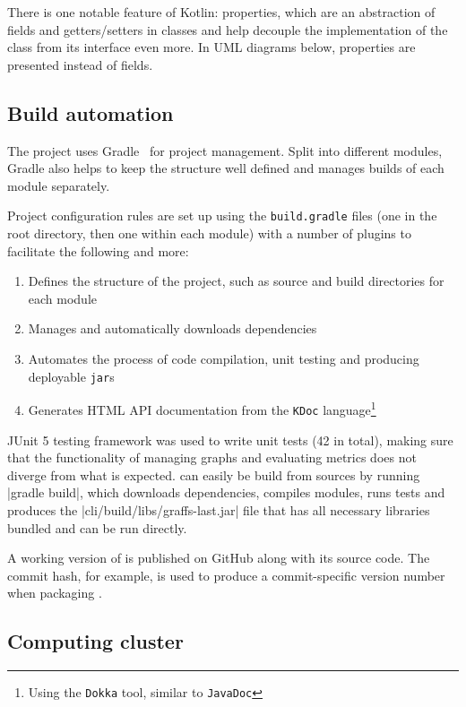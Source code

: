 There is one notable feature of Kotlin: properties, which are an abstraction of fields and getters/setters in classes and help decouple the implementation of the class from its interface even more.
In UML diagrams below, properties are presented instead of fields.

\subsection{Build automation}

The project uses Gradle~\cite{BerglundBuildingTestingGradle2011} for project management.
Split into different modules, Gradle also helps to keep the structure well defined and manages builds of each module separately.

Project configuration rules are set up using the \texttt{build.gradle} files (one in the root directory, then one within each module) with a number of plugins to facilitate the following and more:
\begin{enumerate}[topsep=5pt,itemsep=0pt]
    \item Defines the structure of the project, such as source and build directories for each module
    \item Manages and automatically downloads dependencies
    \item Automates the process of code compilation, unit testing and producing deployable \texttt{jar}s
    \item Generates HTML API documentation from the \texttt{KDoc} language\footnote{Using the \texttt{Dokka} tool, similar to \texttt{JavaDoc}}
\end{enumerate}

JUnit 5 testing framework was used to write unit tests (42 in total), making sure that the functionality of managing graphs and evaluating metrics does not diverge from what is expected.
\graffs can easily be build from sources by running |gradle build|, which downloads dependencies, compiles modules, runs tests and produces the |cli/build/libs/graffs-last.jar| file that has all necessary libraries bundled and can be run directly.

A working version of \graffs is published on GitHub along with its source code.
The commit hash, for example, is used to produce a commit-specific version number when packaging \graffs.

\subsection{Computing cluster}\label{sec:computing_cluster}

